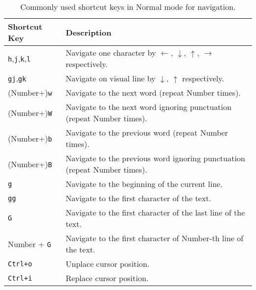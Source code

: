 \documentclass[a4paper]{article}
\begin{document}
\begin{table}
  \centering \caption{Commonly used shortcut keys in Normal mode for navigation.}\label{tab:SKeyNavigate}
  \begin{tabularx}{\textwidth}{lX}
    \hline
    Shortcut Key & Description \\ \hline
    \texttt{h},\texttt{j},\texttt{k},\texttt{l} & Navigate one character by $\leftarrow$, $\downarrow$, $\uparrow$, $\rightarrow$ respectively. \\ \hdashline
    \texttt{gj},\texttt{gk} & Navigate on visual line by $\downarrow$, $\uparrow$ respectively. \\ \hdashline
    (Number+)\texttt{w} & Navigate to the next word (repeat Number times). \\ \hdashline
    (Number+)\texttt{W} & Navigate to the next word ignoring punctuation (repeat Number times). \\ \hdashline
    (Number+)\texttt{b} & Navigate to the previous word (repeat Number times). \\ \hdashline
    (Number+)\texttt{B} & Navigate to the previous word ignoring punctuation (repeat Number times). \\ \hdashline
    \texttt{g} & Navigate to the beginning of the current line. \\ \hdashline
    \texttt{gg} & Navigate to the first character of the text. \\ \hdashline
    \texttt{G} & Navigate to the first character of the last line of the text. \\ \hdashline
    Number + \texttt{G} & Navigate to the first character of Number-th line of the text. \\ \hdashline
    \texttt{Ctrl+o} & Unplace cursor position. \\ \hdashline
    \texttt{Ctrl+i} & Replace cursor position. \\
    \hline
  \end{tabularx}
\end{table}
\end{document}
